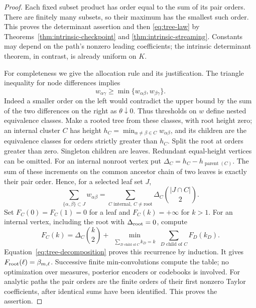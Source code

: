 \documentclass[11pt]{amsart}
\theoremstyle{definition}\newtheorem{definition}[theorem]{Definition}
\theoremstyle{remark}\newtheorem{remark}[theorem]{Remark}
\begin{document}
\begin{proof}
Each fixed subset product has order equal to the sum of its pair orders.
There are finitely many subsets, so their maximum has the smallest such
order. This proves the determinant assertion and then
\eqref{eq:tree-law} by Theorems~\ref{thm:intrinsic-checkpoint} and
\ref{thm:intrinsic-streaming}. Constants may depend on the path's
nonzero leading coefficients; the intrinsic determinant theorem, in
contrast, is already uniform on $K$.

For completeness we give the allocation rule and its justification. The
triangle inequality for node differences implies
\[
 w_{\alpha\gamma}\ge
       \min\{w_{\alpha\beta},w_{\beta\gamma}\}.
\]
Indeed a smaller order on the left would contradict the upper bound by
the sum of the two differences on the right as $\theta\downarrow0$.
Thus thresholds on $w$ define nested equivalence classes. Make a rooted
tree from these classes, with root height zero; an internal cluster $C$
has height $h_C=\min_{\alpha\ne\beta\in C}w_{\alpha\beta}$,
and its children are the equivalence classes for orders strictly greater
than $h_C$. Split the root at orders greater than zero. Singleton
children are leaves. Redundant equal-height vertices can be omitted.
For an internal nonroot vertex put
$\Delta_C=h_C-h_{\operatorname{parent}(C)}$. The sum of these increments
on the common ancestor chain of two leaves is exactly their pair order.
Hence, for a selected leaf set $J$,
\begin{equation}\label{eq:tree-decomposition}
 \sum_{\{\alpha,\beta\}\subset J}w_{\alpha\beta}
   =\sum_{C\text{ internal},\ C\ne\mathrm{root}}
               \Delta_C\binom{|J\cap C|}{2}.
\end{equation}
Set $F_C(0)=F_C(1)=0$ for a leaf and $F_C(k)=+\infty$ for $k>1$.
For an internal vertex, including the root with $\Delta_{\rm root}=0$,
compute
\begin{equation}\label{eq:tree-dp}
 F_C(k)=\Delta_C\binom{k}{2}+
   \min_{\substack{\sum_{D\text{ child of }C}k_D=k}}
                 \sum_{D\text{ child of }C}F_D(k_D).
\end{equation}
Equation~\eqref{eq:tree-decomposition} proves this recurrence by induction.
It gives $F_{\rm root}(\ell)=\beta_{m,\ell}$. Successive finite
min-convolutions compute the table; no optimization over measures,
posterior encoders or codebooks is involved. For analytic paths the pair
orders are the finite orders of their first nonzero Taylor coefficients,
after identical sums have been identified. This proves the assertion.
\end{proof}
\end{document}
